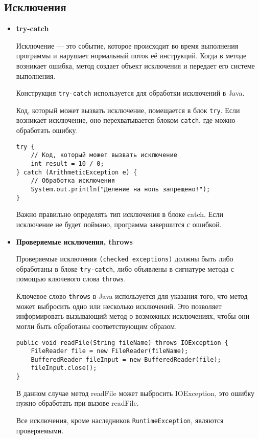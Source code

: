 \subsection{Исключения}
\begin{itemize}
    \item \textbf{try-catch} \par
    Исключение — это событие, которое происходит во время выполнения программы и нарушает нормальный поток её инструкций. \newline
    Когда в методе возникает ошибка, метод создает объект исключения и передает его системе выполнения. \par
    Конструкция \texttt{try-catch} используется для обработки исключений в Java.\par
    Код, который может вызвать исключение, помещается в блок \texttt{try}. Если возникает исключение, оно перехватывается блоком \texttt{catch}, где можно обработать ошибку.
    \begin{verbatim}
try {
    // Код, который может вызвать исключение
    int result = 10 / 0;
} catch (ArithmeticException e) {
    // Обработка исключения
    System.out.println("Деление на ноль запрещено!");
}
    \end{verbatim}
    Важно правильно определять тип исключения в блоке catch.\newline
    Если исключение не будет поймано, программа завершится с ошибкой.

    \item \textbf{Проверяемые исключения, throws} \par
    Проверяемые исключения \texttt{(checked exceptions)} должны быть либо обработаны в блоке \texttt{try-catch}, либо объявлены в сигнатуре метода с помощью ключевого слова \texttt{throws}. \par
    Ключевое слово \texttt{throws} в Java используется для указания того, что метод может выбросить одно или несколько исключений. Это позволяет информировать вызывающий метод о возможных исключениях, чтобы они могли быть обработаны соответствующим образом. \par
    \begin{verbatim}
public void readFile(String fileName) throws IOException {
    FileReader file = new FileReader(fileName);
    BufferedReader fileInput = new BufferedReader(file);
    fileInput.close();
}
    \end{verbatim}
    В данном случае метод readFile может выбросить IOException, это ошибку нужно обработать при вызове readFile. \par
    Все исключения, кроме наследников \texttt{RuntimeException}, являются проверяемыми.


\end{itemize}
